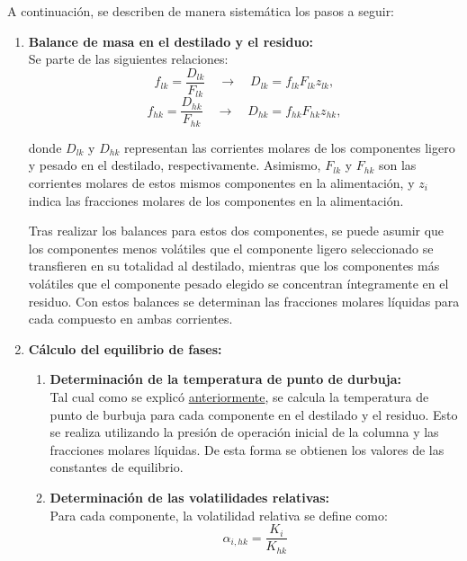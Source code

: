 A continuación, se describen de manera sistemática los pasos a seguir:
\begin{enumerate}
    \item \textbf{Balance de masa en el destilado y el residuo:}\\
          Se parte de las siguientes relaciones:
          $$
              f_{lk} = \frac{D_{lk}}{F_{lk}} \quad \longrightarrow \quad D_{lk} = f_{lk} F_{lk} z_{lk},
          $$
          $$
              f_{hk} = \frac{D_{hk}}{F_{hk}} \quad \longrightarrow \quad D_{hk} = f_{hk} F_{hk} z_{hk},
          $$

          donde $ D_{lk} $ y $ D_{hk} $ representan las corrientes molares de los componentes ligero y pesado en el destilado, respectivamente. Asimismo, $ F_{lk} $ y $ F_{hk} $ son las corrientes molares de estos mismos componentes en la alimentación, y $ z_i $ indica las fracciones molares de los componentes en la alimentación.

          Tras realizar los balances para estos dos componentes, se puede asumir que los componentes menos volátiles que el componente ligero seleccionado se transfieren en su totalidad al destilado, mientras que los componentes más volátiles que el componente pesado elegido se concentran íntegramente en el residuo. Con estos balances se determinan las fracciones molares líquidas para cada compuesto en ambas corrientes.

    \item \textbf{Cálculo del equilibrio de fases:}\\
          \begin{enumerate}
              \item \textbf{Determinación de la temperatura de punto de durbuja:}\\
                    Tal cual como se explicó \hyperref[ss_sec:temperatura_punto_burbuja]{anteriormente}, se calcula la temperatura de punto de burbuja para cada componente en el destilado y el residuo. Esto se realiza utilizando la presión de operación inicial de la columna y las fracciones molares líquidas. De esta forma se obtienen los valores de las constantes de equilibrio.

              \item \textbf{Determinación de las volatilidades relativas:}\\
                    Para cada componente, la volatilidad relativa se define como:
                    $$
                        \alpha_{i, hk} = \frac{K_{i}}{K_{hk}}
                    $$


\end{enumerate}
\end{enumerate}
